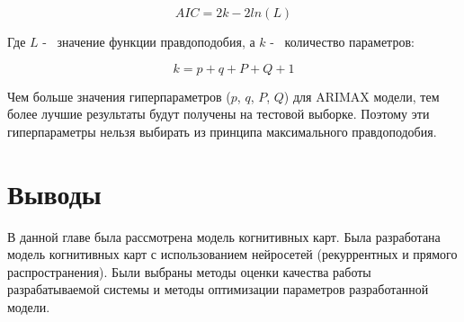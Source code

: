 \begin{equation}\label{eq:akaike}
	AIC = 2k - 2 ln(L)
\end{equation}

\noindent Где $ L $ -~ значение функции правдоподобия,
а $ k $ -~ количество параметров:

\begin{equation}\label{eq:params_amount_akaike}
	k = p + q + P + Q + 1
\end{equation}

Чем больше значения гиперпараметров ($ p $, $ q $, $ P $, $ Q $) для ARIMAX модели, тем более лучшие
результаты будут получены на тестовой выборке. Поэтому эти гиперпараметры нельзя
выбирать из принципа максимального правдоподобия.

\section{Выводы}

В данной главе была рассмотрена модель когнитивных карт.
Была разработана модель когнитивных карт
с использованием нейросетей (рекуррентных и прямого распространения).
Были выбраны методы оценки качества работы разрабатываемой системы
и методы оптимизации параметров разработанной модели.

